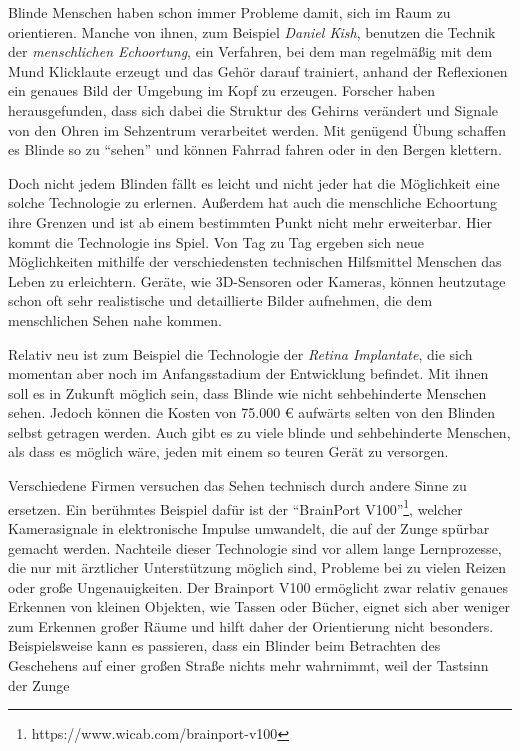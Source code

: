 \documentclass[a4paper,12pt,ngerman]{scrartcl}
\begin{document}
Blinde Menschen haben schon immer Probleme damit, sich im Raum zu orientieren.
Manche von ihnen, zum Beispiel \textit{Daniel Kish}, benutzen die Technik der 
\textit{menschlichen Echoortung}, ein Verfahren, bei dem
man regelmäßig mit dem Mund Klicklaute erzeugt und das Gehör darauf trainiert,
anhand der Reflexionen ein genaues Bild der Umgebung im Kopf zu erzeugen.
Forscher haben herausgefunden, dass sich dabei die Struktur des Gehirns verändert 
und Signale von den Ohren im Sehzentrum verarbeitet werden.
Mit genügend Übung schaffen es Blinde so zu \enquote{sehen} und können Fahrrad 
fahren oder in den Bergen klettern. \par 
Doch nicht jedem Blinden fällt es leicht und nicht jeder hat die Möglichkeit eine
solche Technologie zu erlernen. Außerdem hat auch die menschliche Echoortung ihre
Grenzen und ist ab einem bestimmten Punkt nicht mehr erweiterbar. Hier kommt die 
Technologie ins Spiel. Von Tag zu Tag ergeben sich neue Möglichkeiten mithilfe 
der verschiedensten technischen Hilfsmittel Menschen das Leben zu erleichtern.
Geräte, wie 3D-Sensoren oder Kameras, können heutzutage schon oft sehr realistische
und detaillierte Bilder aufnehmen, die dem menschlichen Sehen nahe kommen. \par 
Relativ neu ist zum Beispiel die Technologie der \textit{Retina Implantate}, die sich 
momentan aber noch im Anfangsstadium der Entwicklung befindet. Mit ihnen soll es in 
Zukunft möglich sein, dass Blinde wie nicht sehbehinderte Menschen sehen. Jedoch
können die Kosten von 75.000 \euro{} aufwärts selten von den Blinden selbst getragen
werden. Auch gibt es zu viele
blinde und sehbehinderte Menschen, als dass es möglich wäre, jeden mit einem so 
teuren Gerät zu versorgen.\par 
Verschiedene Firmen versuchen das Sehen technisch durch andere Sinne zu ersetzen.
Ein berühmtes Beispiel dafür ist der 
\enquote{BrainPort V100}\footnote{https://www.wicab.com/brainport-v100}, welcher 
Kamerasignale in elektronische Impulse umwandelt, die auf der Zunge spürbar
gemacht werden. Nachteile dieser
Technologie sind vor allem lange Lernprozesse, die nur mit ärztlicher Unterstützung
möglich sind, Probleme bei zu vielen Reizen oder große Ungenauigkeiten. Der Brainport V100 ermöglicht
zwar relativ genaues Erkennen von kleinen Objekten, wie Tassen oder Bücher, eignet sich aber weniger zum
Erkennen großer Räume und hilft daher der Orientierung nicht besonders.
Beispielsweise kann es passieren, dass ein Blinder beim Betrachten des Geschehens auf 
einer großen Straße nichts mehr wahrnimmt, weil der Tastsinn der Zunge
\end{document}
